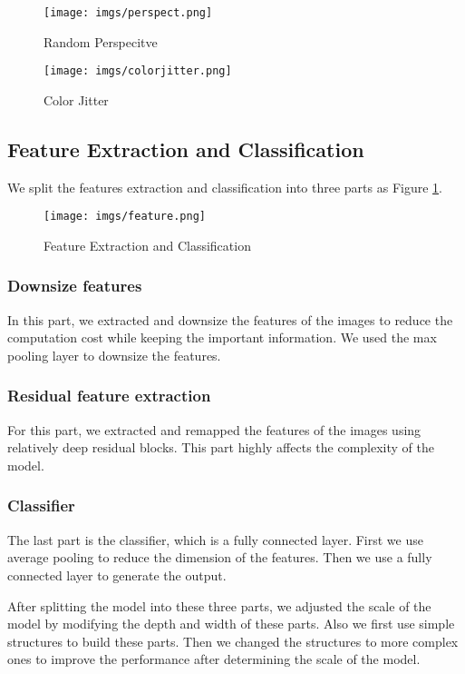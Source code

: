 \documentclass[12pt]{article}
\begin{document}
\begin{figure}[h]
    \centering
    \texttt{[image: imgs/perspect.png]}
    \caption{Random Perspecitve}
\end{figure}
\begin{figure}[h]
    \centering
    \texttt{[image: imgs/colorjitter.png]}
    \caption{Color Jitter}
\end{figure}
\FloatBarrier

\subsection{Feature Extraction and Classification}

We split the features extraction and classification into three parts as Figure \ref{feat}.
\begin{figure}[h]
    \centering
    \texttt{[image: imgs/feature.png]}
    \caption{Feature Extraction and Classification}
    \label{feat}
\end{figure}

\subsubsection{Downsize features}

In this part, we extracted and downsize the features of the images to reduce the computation cost while keeping the important information. We used the max pooling layer to downsize the features.

\subsubsection{Residual feature extraction}

For this part, we extracted and remapped the features of the images using relatively deep residual blocks. This part highly affects the complexity of the model.

\subsubsection{Classifier}

The last part is the classifier, which is a fully connected layer. First we use average pooling to reduce the dimension of the features. Then we use a fully connected layer to generate the output.

After splitting the model into these three parts, we adjusted the scale of the model by modifying the depth and width of these parts. Also we first use simple structures to build these parts. Then we changed the structures to more complex ones to improve the performance after determining the scale of the model.
\end{document}
